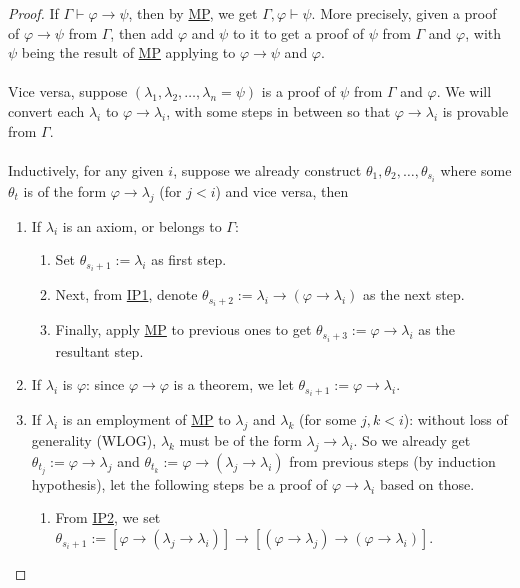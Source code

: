 \documentclass{treatise}
\begin{document}
\begin{proof}
If $\Gamma \vdash \varphi \to \psi$, then by \hyperref[HPL-R-MP]{MP}, we get $\Gamma, \varphi \vdash \psi$. More precisely, given a proof of $\varphi \to \psi$ from $\Gamma$, then add $\varphi$ and $\psi$ to it to get a proof of $\psi$ from $\Gamma$ and $\varphi$, with $\psi$ being the result of \hyperref[HPL-R-MP]{MP} applying to $\varphi \to \psi$ and $\varphi$.
\\
\\
Vice versa, suppose $(\lambda_1, \lambda_2, \hdots, \lambda_n = \psi)$ is a proof of $\psi$ from $\Gamma$ and $\varphi$. We will convert each $\lambda_i$ to $\varphi \to \lambda_i$, with some steps in between so that $\varphi \to \lambda_i$ is provable from $\Gamma$.
\\
\\
Inductively, for any given $i$, suppose we already construct $\theta_1, \theta_2, \hdots, \theta_{s_i}$ where some $\theta_t$ is of the form $\varphi \to \lambda_j$ (for $j < i$) and vice versa, then
\begin{enumerate}
    \item If $\lambda_i$ is an axiom, or belongs to $\Gamma$:
    \begin{enumerate}
        \item Set $\theta_{s_i + 1} := \lambda_i$ as first step.
        \item Next, from \hyperref[HPL-A-IP1]{IP1}, denote $\theta_{s_i + 2} := \lambda_i \to (\varphi \to \lambda_i)$ as the next step.
        \item Finally, apply \hyperref[HPL-R-MP]{MP} to previous ones to get $\theta_{s_i + 3} := \varphi \to \lambda_i$ as the resultant step.
    \end{enumerate}
    \item If $\lambda_i$ is $\varphi$: since $\varphi \to \varphi$ is a theorem, we let $\theta_{s_i + 1} := \varphi \to \lambda_i$.
    \item If $\lambda_i$ is an employment of \hyperref[HPL-R-MP]{MP} to $\lambda_j$ and $\lambda_k$ (for some $j, k < i$): without loss of generality (WLOG), $\lambda_k$ must be of the form $\lambda_j \to \lambda_i$. So we already get $\theta_{t_j} := \varphi \to \lambda_j$ and $\theta_{t_k} := \varphi \to (\lambda_j \to \lambda_i)$ from previous steps (by induction hypothesis), let the following steps be a proof of $\varphi \to \lambda_i$ based on those.
    \begin{enumerate}
        \item From \hyperref[HPL-A-IP2]{IP2}, we set $\theta_{s_i + 1} := [\varphi \to (\lambda_j \to \lambda_i)] \to [(\varphi \to \lambda_j) \to (\varphi \to \lambda_i)]$.

\end{enumerate}
\end{enumerate}
\end{proof}
\end{document}
